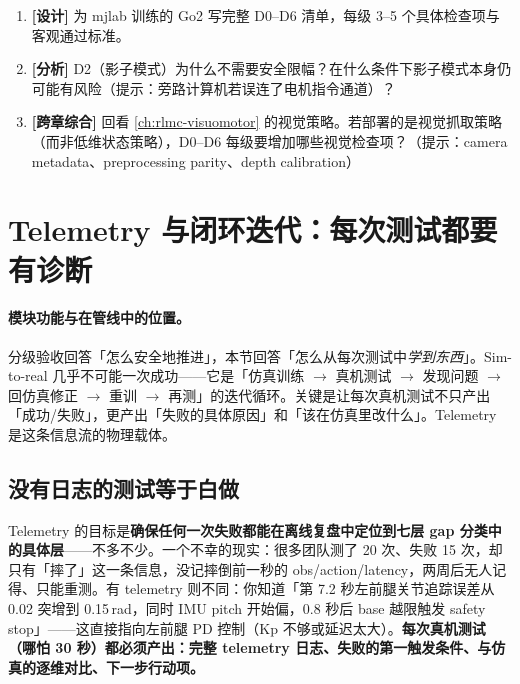 \begin{practice}[分级验收动手]
\begin{enumerate}
  \item \textbf{[设计]} 为 mjlab 训练的 Go2 写完整 D0--D6 清单，每级 3--5 个具体检查项与客观通过标准。
  \item \textbf{[分析]} D2（影子模式）为什么不需要安全限幅？在什么条件下影子模式本身仍可能有风险（提示：旁路计算机若误连了电机指令通道）？
  \item \textbf{[跨章综合]} 回看 \cref{ch:rlmc-visuomotor} 的视觉策略。若部署的是视觉抓取策略（而非低维状态策略），D0--D6 每级要增加哪些视觉检查项？（提示：camera metadata、preprocessing parity、depth calibration）
\end{enumerate}
\end{practice}

\section{Telemetry 与闭环迭代：每次测试都要有诊断}
\label{sec:rlmc-s2r-telemetry}

\paragraph{模块功能与在管线中的位置。}分级验收回答「怎么安全地推进」，本节回答「怎么从每次测试中\emph{学到东西}」。Sim-to-real 几乎不可能一次成功——它是「仿真训练 $\to$ 真机测试 $\to$ 发现问题 $\to$ 回仿真修正 $\to$ 重训 $\to$ 再测」的迭代循环。关键是让每次真机测试不只产出「成功/失败」，更产出「失败的具体原因」和「该在仿真里改什么」。Telemetry 是这条信息流的物理载体。

\subsection{没有日志的测试等于白做}
\label{sec:rlmc-s2r-telemetry-why}

\begin{insight}\label{ins:rlmc-s2r-telemetry}
Telemetry 的目标是\textbf{确保任何一次失败都能在离线复盘中定位到七层 gap 分类中的具体层}——不多不少。一个不幸的现实：很多团队测了 20 次、失败 15 次，却只有「摔了」这一条信息，没记摔倒前一秒的 obs/action/latency，两周后无人记得、只能重测。有 telemetry 则不同：你知道「第 7.2 秒左前腿关节追踪误差从 0.02 突增到 0.15\,rad，同时 IMU pitch 开始偏，0.8 秒后 base 越限触发 safety stop」——这直接指向左前腿 PD 控制（Kp 不够或延迟太大）。\textbf{每次真机测试（哪怕 30 秒）都必须产出：完整 telemetry 日志、失败的第一触发条件、与仿真的逐维对比、下一步行动项。}
\end{insight}

